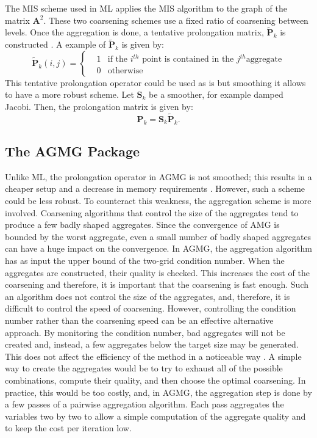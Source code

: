 \documentclass[preprint,10pt]{elsarticle}
\newcommand\bs{\boldsymbol}
\renewcommand{\(}{\left(}
\renewcommand{\)}{\right)}
\renewcommand{\[}{\left[}
\renewcommand{\]}{\right]}
\begin{document}
The MIS scheme used in ML applies the MIS algorithm \cite{graph_coloring} to
the graph of the matrix $\bs{A}^2$. These two coarsening 
schemes use a fixed ratio of coarsening between levels. 
%
Once the aggregation is done, a tentative prolongation matrix, $\bs{\tilde{P}}_k$ 
is constructed \cite{mis}. A example of $\bs{\tilde{P}}_k$ is given by:
\begin{equation}
  \bs{\tilde{P}}_k(i,j) = \left\{
  \begin{aligned}
    &1 &\textrm{if the }i^{th}\textrm{ point is contained in the }j^{th}\textrm{
    aggregate}\\
    & 0 &\textrm{otherwise}
  \end{aligned}
  \right.
\end{equation}
This tentative prolongation operator could be used as is but smoothing it
allows to have a more robust scheme. Let $\bs{S}_k$ be a smoother, for example
damped Jacobi. Then, the prolongation matrix is given by:
\begin{equation}
  \bs{P}_k = \bs{S}_k \bs{\tilde{P}}_k.
\end{equation}

\subsection{The AGMG Package}
Unlike ML, the prolongation operator in AGMG is not smoothed; this results in a
cheaper setup and a decrease in memory requirements \cite{agmg2}. However,
such a scheme could be less robust. To counteract this weakness, the
aggregation scheme is more involved. Coarsening algorithms that control
the size of the aggregates tend to produce a few badly shaped aggregates.
Since the convergence of AMG is bounded by the worst aggregate, even a small 
number of badly shaped aggregates can have a huge impact on
the convergence. In AGMG, the aggregation algorithm has as input the upper
bound of the two-grid condition number. When the aggregates are constructed,
their quality is checked. This increases the cost of the coarsening
and therefore, it is important that the coarsening is fast enough. Such an 
algorithm does not control the size of the aggregates, and, therefore, it is 
difficult to control the speed of coarsening. However, controlling the condition 
number rather than the coarsening speed can be an effective alternative approach. By 
monitoring the condition number, bad aggregates will not be created and, instead, 
a few aggregates below the target size may be generated. This  
does not affect the efficiency of the method in a noticeable way \cite{agmg2}. 
A simple way to create the aggregates would be to try to exhaust all of the possible 
combinations, compute their quality, and then choose the optimal
coarsening. In practice, this would be too costly, and, in AGMG, the aggregation 
step is done by a few passes of a pairwise aggregation algorithm. Each pass
aggregates the variables two by two to allow a simple computation of the aggregate 
quality and to keep the cost per iteration low. 
\end{document}
